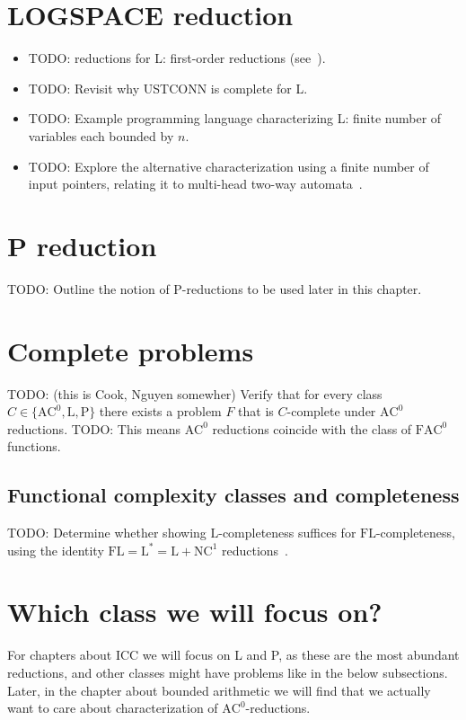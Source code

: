 \section{LOGSPACE reduction}
\begin{itemize}
\item TODO: reductions for L: first-order reductions (see~\cite[Section~5.1]{Immerman1999-IMMDC}).
\item TODO: Revisit why USTCONN is complete for L.
\item TODO: Example programming language characterizing L: finite number of variables each bounded by $n$.
\item TODO: Explore the alternative characterization using a finite number of input pointers, relating it to multi-head two-way automata~\cite{423885,10.1007/BF00289513}.
\end{itemize}

\section{P reduction}
TODO: Outline the notion of P-reductions to be used later in this chapter.

\section{Complete problems}
\label{sec:complete-problems}
TODO: (this is Cook, Nguyen somewher) Verify that for every class $C \in \{\text{AC}^0, \text{L}, \text{P}\}$ there exists a problem $F$ that is $C$-complete under $\text{AC}^0$ reductions.
TODO: This means $\text{AC}^0$ reductions coincide with the class of $\mathrm{FAC}^0$ functions.

\subsection{Functional complexity classes and completeness}
TODO: Determine whether showing $\text{L}$-completeness suffices for $\text{FL}$-completeness, using the identity $\text{FL} = \text{L}^* = \text{L} + \text{NC}^1$ reductions~\cite[Proposition~4.1]{COOK19852}.

\section{Which class we will focus on?}
\label{sec:classes-of-interest}
For chapters about ICC we will focus on L and P, as these are the most abundant reductions,
and other classes might have problems like in the below subsections.
Later, in the chapter about bounded arithmetic we will find that we actually want to care
about characterization of $\text{AC}^0$-reductions.

